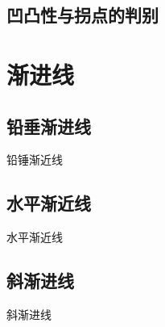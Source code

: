 \documentclass[12pt, a4paper, oneside, UTF8]{ctexbook}  %
\begin{document}
\subsection{凹凸性与拐点的判别}

\section{渐进线}

\subsection{铅垂渐进线}
\begin{defn}{铅锤渐近线}{}

\end{defn}
\subsection{水平渐近线}
\begin{defn}{水平渐近线}{}

\end{defn}
\subsection{斜渐进线}
\begin{defn}{斜渐进线}{}

\end{defn}
\ifx\allfiles\undefined
\end{document}
